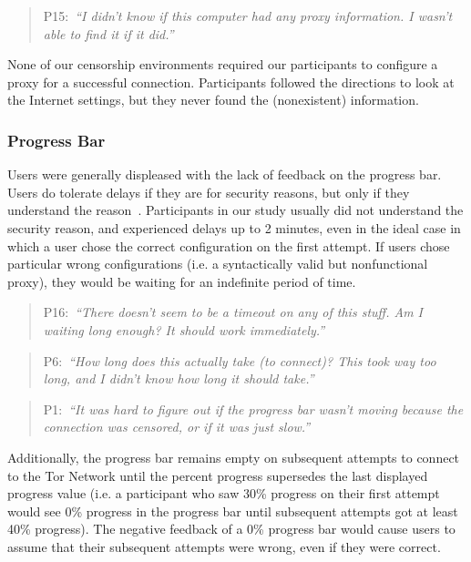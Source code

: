 \documentclass[USenglish,oneside,twocolumn]{article}
\newcommand{\pquote}[2]{
\begin{quotation}
\noindent #1:~\textit{``#2''}
\end{quotation}
}
\begin{document}
\pquote{P15}{I didn't know if this computer had any proxy information. I wasn't able to find it if it did.}

None of our censorship environments required our participants to configure a proxy for a successful connection. Participants followed the directions to look at the Internet settings, but they never found the (nonexistent) information.

\subsubsection{Progress Bar} 
Users were generally displeased with the lack of feedback on the progress bar. Users do tolerate delays if they are for security reasons, but only if they understand the reason~\cite{egelmanplease}. Participants in our study usually did not understand the security reason, and experienced delays up to 2 minutes, even in the ideal case in which a user chose the correct configuration on the first attempt. If users chose particular wrong configurations (i.e. a syntactically valid but nonfunctional proxy), they would be waiting for an indefinite period of time. 

\pquote{P16}{There doesn't seem to be a timeout on any of this stuff. Am I waiting long enough? It should work immediately.}
\pquote{P6}{How long does this actually take (to connect)? This took way too long, and I didn't know how long it should take.}
\pquote{P1}{It was hard to figure out if the progress bar wasn't moving because the connection was censored, or if it was just slow.}

Additionally, the progress bar remains empty on subsequent attempts to connect to the Tor Network until the percent progress supersedes the last displayed progress value (i.e. a participant who saw 30\% progress on their first attempt would see 0\% progress in the progress bar until subsequent attempts got at least 40\% progress). The negative feedback of a 0\% progress bar would cause users to assume that their subsequent attempts were wrong, even if they were correct. 
\end{document}
